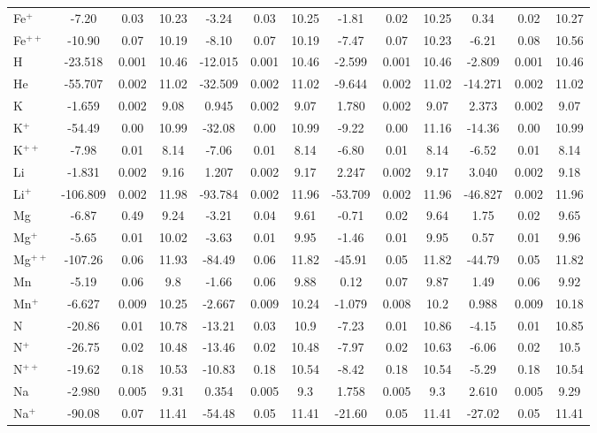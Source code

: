 \begin{longtable}{l!{\vrule width 0.25pt}ccc!{\vrule width 0.25pt}ccc!{\vrule width 0.25pt}ccc!{\vrule width 0.25pt}ccc}
Fe$^+$ & -7.20 & 0.03 & 10.23 & -3.24 & 0.03 & 10.25 & -1.81 & 0.02 & 10.25 & 0.34 & 0.02 & 10.27 \\
Fe$^{++}$ & -10.90 & 0.07 & 10.19 & -8.10 & 0.07 & 10.19 & -7.47 & 0.07 & 10.23 & -6.21 & 0.08 & 10.56 \\
H & -23.518 & 0.001 & 10.46 & -12.015 & 0.001 & 10.46 & -2.599 & 0.001 & 10.46 & -2.809 & 0.001 & 10.46 \\
He & -55.707 & 0.002 & 11.02 & -32.509 & 0.002 & 11.02 & -9.644 & 0.002 & 11.02 & -14.271 & 0.002 & 11.02 \\
K & -1.659 & 0.002 & 9.08 & 0.945 & 0.002 & 9.07 & 1.780 & 0.002 & 9.07 & 2.373 & 0.002 & 9.07 \\
K$^+$ & -54.49 & 0.00 & 10.99 & -32.08 & 0.00 & 10.99 & -9.22 & 0.00 & 11.16 & -14.36 & 0.00 & 10.99 \\
K$^{++}$ & -7.98 & 0.01 & 8.14 & -7.06 & 0.01 & 8.14 & -6.80 & 0.01 & 8.14 & -6.52 & 0.01 & 8.14 \\
Li & -1.831 & 0.002 & 9.16 & 1.207 & 0.002 & 9.17 & 2.247 & 0.002 & 9.17 & 3.040 & 0.002 & 9.18 \\
Li$^+$ & -106.809 & 0.002 & 11.98 & -93.784 & 0.002 & 11.96 & -53.709 & 0.002 & 11.96 & -46.827 & 0.002 & 11.96 \\
Mg & -6.87 & 0.49 & 9.24 & -3.21 & 0.04 & 9.61 & -0.71 & 0.02 & 9.64 & 1.75 & 0.02 & 9.65 \\
Mg$^+$ & -5.65 & 0.01 & 10.02 & -3.63 & 0.01 & 9.95 & -1.46 & 0.01 & 9.95 & 0.57 & 0.01 & 9.96 \\
Mg$^{++}$ & -107.26 & 0.06 & 11.93 & -84.49 & 0.06 & 11.82 & -45.91 & 0.05 & 11.82 & -44.79 & 0.05 & 11.82 \\
Mn & -5.19 & 0.06 & 9.8 & -1.66 & 0.06 & 9.88 & 0.12 & 0.07 & 9.87 & 1.49 & 0.06 & 9.92 \\
Mn$^+$ & -6.627 & 0.009 & 10.25 & -2.667 & 0.009 & 10.24 & -1.079 & 0.008 & 10.2 & 0.988 & 0.009 & 10.18 \\
N & -20.86 & 0.01 & 10.78 & -13.21 & 0.03 & 10.9 & -7.23 & 0.01 & 10.86 & -4.15 & 0.01 & 10.85 \\
N$^+$ & -26.75 & 0.02 & 10.48 & -13.46 & 0.02 & 10.48 & -7.97 & 0.02 & 10.63 & -6.06 & 0.02 & 10.5 \\
N$^{++}$ & -19.62 & 0.18 & 10.53 & -10.83 & 0.18 & 10.54 & -8.42 & 0.18 & 10.54 & -5.29 & 0.18 & 10.54 \\
Na & -2.980 & 0.005 & 9.31 & 0.354 & 0.005 & 9.3 & 1.758 & 0.005 & 9.3 & 2.610 & 0.005 & 9.29 \\
Na$^+$ & -90.08 & 0.07 & 11.41 & -54.48 & 0.05 & 11.41 & -21.60 & 0.05 & 11.41 & -27.02 & 0.05 & 11.41 \\

\end{longtable}
